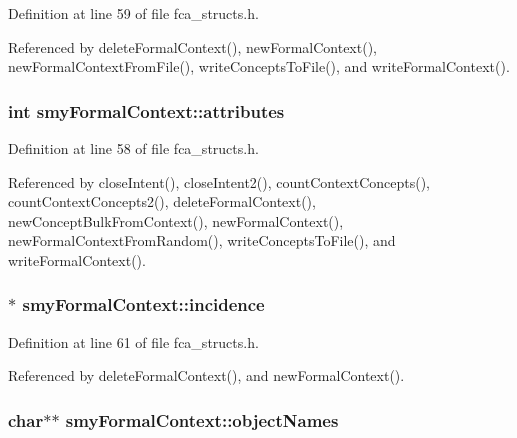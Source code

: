 \-Definition at line 59 of file fca\-\_\-structs.\-h.



\-Referenced by delete\-Formal\-Context(), new\-Formal\-Context(), new\-Formal\-Context\-From\-File(), write\-Concepts\-To\-File(), and write\-Formal\-Context().

\hypertarget{structsmyFormalContext_a4ae89e8f42fd7feab4db872cd8472b5e}{
\subsubsection[{attributes}]{\setlength{\rightskip}{0pt plus 5cm}int {\bf smy\-Formal\-Context\-::attributes}}}\label{structsmyFormalContext_a4ae89e8f42fd7feab4db872cd8472b5e}


\-Definition at line 58 of file fca\-\_\-structs.\-h.



\-Referenced by close\-Intent(), close\-Intent2(), count\-Context\-Concepts(), count\-Context\-Concepts2(), delete\-Formal\-Context(), new\-Concept\-Bulk\-From\-Context(), new\-Formal\-Context(), new\-Formal\-Context\-From\-Random(), write\-Concepts\-To\-File(), and write\-Formal\-Context().

\hypertarget{structsmyFormalContext_a55d9d4c2e38c3571e9f6e870bc1c06b8}{
\subsubsection[{incidence}]{$\ast$ {\bf smy\-Formal\-Context\-::incidence}}}\label{structsmyFormalContext_a55d9d4c2e38c3571e9f6e870bc1c06b8}


\-Definition at line 61 of file fca\-\_\-structs.\-h.



\-Referenced by delete\-Formal\-Context(), and new\-Formal\-Context().

\hypertarget{structsmyFormalContext_a732a2615921f2d209fb7d9341df2c183}{
\subsubsection[{object\-Names}]{\setlength{\rightskip}{0pt plus 5cm}char$\ast$$\ast$ {\bf smy\-Formal\-Context\-::object\-Names}}}\label{structsmyFormalContext_a732a2615921f2d209fb7d9341df2c183}


